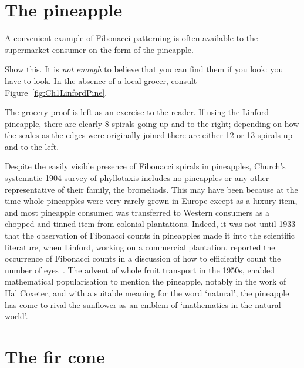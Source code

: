  \section{The pineapple}
A convenient example of Fibonacci patterning is often available to the supermarket consumer on the form of the pineapple.
\begin{exercise}
	\label{ex:doit}
	Show this.  It is \emph{not enough} to believe that you can find them if you look: you have to look. In the absence of a local grocer, consult Figure~\ref{fig:Ch1LinfordPine}.
\end{exercise}
\begin{solution}
	The grocery proof is left as an exercise to the reader. If using the Linford pineapple, there are clearly 8 spirals going up and to the right; depending on how the scales as the edges were originally joined there are either 12 or 13 spirals up and to the left. 
\end{solution} 
Despite the easily visible presence of Fibonacci spirals in pineapples, Church's systematic 1904 survey of phyllotaxis includes no pineapples or any other representative of their family, the bromeliads. This may have been because at the time whole pineapples were very rarely grown in Europe except as a luxury item, and most pineapple consumed was transferred to Western consumers as a chopped and tinned item from colonial plantations. Indeed, it was not until 1933 that the observation of Fibonacci counts in pineapples made it into the scientific literature, when Linford, working on a commercial plantation, reported the occurrence of Fibonacci counts in a discussion of how to efficiently count the number of eyes~\cite{linfordFruitQualityStudies1933}. The advent of whole fruit transport in the 1950s, enabled  mathematical popularisation to mention the pineapple, notably in the work of Hal Coxeter, and with a suitable meaning for the word `natural',  the pineapple has come to rival the sunflower as an emblem of `mathematics in the natural world'.

 \clearpage
\section{The fir cone}

